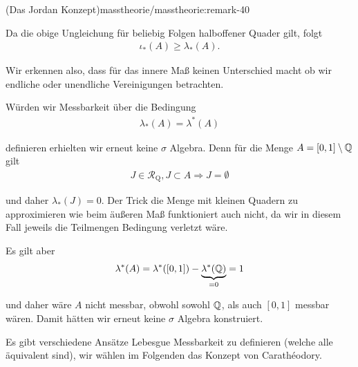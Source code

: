 \begin{remark}{(Das Jordan Konzept)}{masstheorie/masstheorie:remark-40}
\par
Da die obige Ungleichung für beliebig Folgen halboffener Quader gilt, folgt
\begin{align*}
\iota_\ast(A) \geq \lambda_\ast(A).
\end{align*}
\par
Wir erkennen also, dass für das innere Maß keinen Unterschied macht ob wir endliche oder unendliche Vereinigungen betrachten.

\par
Würden wir Messbarkeit über die Bedingung
\begin{align*}
\lambda_\ast(A)=\lambda^\ast(A)
\end{align*}
\par
definieren erhielten wir erneut keine \(\sigma\) Algebra. Denn für die Menge \(A=[0,1]\setminus\mathbb{Q}\) gilt
\begin{align*}
J\in\mathcal{R}_{\text{Q}}, J\subset A\Rightarrow J=\emptyset
\end{align*}
\par
und daher \(\lambda_\ast(J) = 0\). Der Trick die Menge mit kleinen Quadern zu approximieren wie beim äußeren Maß funktioniert auch nicht, da wir in diesem Fall jeweils die Teilmengen Bedingung verletzt wäre.

\par
Es gilt aber
\begin{align*}
\lambda^\ast(A) = \lambda^\ast([0,1]) - \underbrace{\lambda^\ast(\mathbb{Q})}_{=0} = 1
\end{align*}
\par
und daher wäre \(A\) nicht messbar, obwohl sowohl \(\mathbb{Q}\), als auch \([0,1]\) messbar wären. Damit hätten wir erneut keine \(\sigma\) Algebra konstruiert.
\end{remark}

\par
Es gibt verschiedene Ansätze Lebesgue Messbarkeit zu definieren (welche alle äquivalent sind), wir wählen im Folgenden das Konzept von
Carathéodory.


